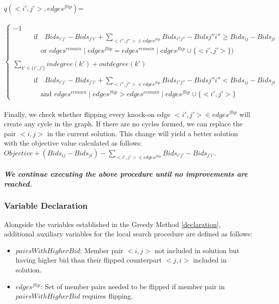 \documentclass{article}
\begin{document}
$q(<i',j'>, edges^{flip})$=\\
\\
\begin{displaymath}
    \begin{cases}
    -1 & \\
    \qquad\quad\textrm{if} \quad Bids_{i'j'} - Bids_{j'i'} + \sum_{<i'',j''> \in edges^{flip}} Bids_{i''j''} - Bids{j''i''} \geq Bids_{ij} - Bids_{ji}\\
    \qquad\quad\quad\textrm{or } edges^{remain} \mid edges^{flip} = edges^{remain} \mid edges^{flip} \cup \{<i',j'>\})\\
    \\
    \sum_{k' \in \{i',j'\}} indegree(k') + outdegree(k') & \\
    \\
    \qquad\quad\textrm{if} \quad Bids_{i'j'} - Bids_{j'i'} + \sum_{<i'',j''> \in edges^{flip}} Bids_{i''j''} - Bids{j''i''} < Bids_{ij} - Bids_{ji}\\
    \qquad\quad\quad\textrm{and } edges^{remain} \mid edges^{flip} > edges^{remain} \mid edges^{flip} \cup \{<i',j'>\}
    \end{cases}
\end{displaymath}
\\
Finally, we check whether flipping every knock-on edge $<i',j'> \in edges^{flip}$ will create any cycle in the graph. If there are no cycles formed, we can replace the pair $<i,j>$ in the current solution. This change will yield a better solution with the objective value calculated as follows: $Objective + (Bids_{ij} - Bids_{ji}) - \sum_{<i',j'> \in edges^{flip}} Bids_{i'j'} - Bids_{j'i'}$.\\
\\
\textbf{\textit{We continue executing the above procedure until no improvements are reached.}}

\subsubsection{Variable Declaration} \label{ls_declaration}

Alongside the variables established in the Greedy Method \ref{declaration}, additional auxiliary variables for the local search procedure are defined as follows:
\begin{itemize}
    \item $pairsWithHigherBid$: Member pair $<i,j>$ not included in solution but having higher bid than their flipped counterpart $<j,i>$ included in solution.
    \item $edges^{flip}$: Set of member pairs needed to be flipped if member pair in $pairsWithHigherBid$ requires flipping.
\end{itemize}
\end{document}
